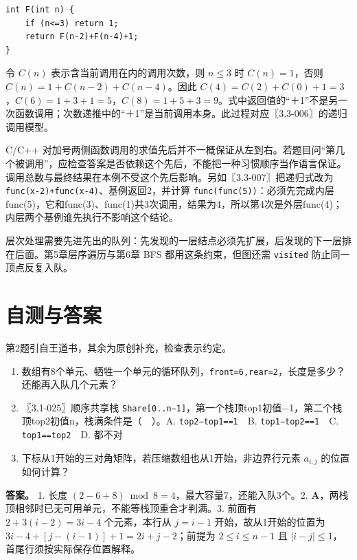 \par\medskip\noindent
\begin{minipage}{\linewidth}
\begin{verbatim}
int F(int n) {
    if (n<=3) return 1;
    return F(n-2)+F(n-4)+1;
}
\end{verbatim}
\end{minipage}\par\medskip

令 \(C(n)\) 表示含当前调用在内的调用次数，则 \(n\le3\) 时 \(C(n)=1\)，否则 \(C(n)=1+C(n-2)+C(n-4)\)。因此 \(C(4)=C(2)+C(0)+1=3\)，\(C(6)=1+3+1=5\)，\(C(8)=1+5+3=9\)。式中返回值的``＋1''不是另一次函数调用；次数递推中的``＋1''是当前调用本身。此过程对应〖3.3-006〗的递归调用模型。

C/C++ 对加号两侧函数调用的求值先后并不一概保证从左到右。若题目问``第几个被调用''，应检查答案是否依赖这个先后，不能把一种习惯顺序当作语言保证。调用总数与最终结果在本例不受这个先后影响。另如〖3.3-007〗把递归式改为 \texttt{func(x-2)+func(x-4)}、基例返回2，并计算 \texttt{func(func(5))}：必须先完成内层func(5)，它和func(3)、func(1)共3次调用，结果为4，所以第4次是外层func(4)；内层两个基例谁先执行不影响这个结论。

层次处理需要先进先出的队列：先发现的一层结点必须先扩展，后发现的下一层排在后面。第5章层序遍历与第6章 BFS 都用这条约束，但图还需 \texttt{visited} 防止同一顶点反复入队。

\section{自测与答案}\label{ds-ch3-check}

第2题引自王道书，其余为原创补充，检查表示约定。

\begin{enumerate}
\def\labelenumi{\arabic{enumi}.}
\tightlist
\item
  数组有8个单元、牺牲一个单元的循环队列，\texttt{front=6,}\allowbreak{}\texttt{rear=2}，长度是多少？还能再入队几个元素？
\item
  〖3.1-025〗顺序共享栈 \texttt{Share{[}0..n−1{]}}，第一个栈顶top1初值−1，第二个栈顶top2初值n，栈满条件是（　）。A. \texttt{top2−top1==1}　B. \texttt{top1−top2==1}　C. \texttt{top1==top2}　D. 都不对
\item
  下标从1开始的三对角矩阵，若压缩数组也从1开始，非边界行元素 \(a_{i,j}\) 的位置如何计算？
\end{enumerate}

\textbf{答案。} 1. 长度 \((2-6+8)\bmod8=4\)，最大容量7，还能入队3个。2. \textbf{A}，两栈顶相邻时已无可用单元，不能等栈顶重合才判满。3. 前面有 \(2+3(i-2)=3i-4\) 个元素，本行从 \(j=i-1\) 开始，故从1开始的位置为 \(3i-4+[j-(i-1)]+1=2i+j-2\)；前提为 \(2\le i\le n-1\) 且 \(|i-j|\le1\)，首尾行须按实际保存位置解释。

